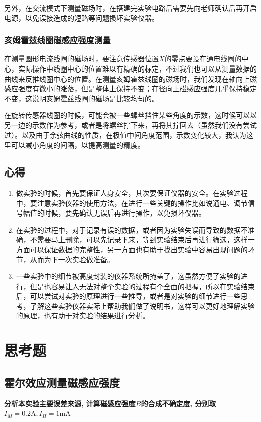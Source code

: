 \documentclass[zihao=5, UTF8]{article}
\theoremstyle{MyLineTheoremStyle} %
\theoremstyle{MyBlockTheoremStyle} %
\theoremstyle{MySubsubsectionStyle} %
\begin{document}
另外，在交流模式下测量磁场时，在搭建完实验电路后需要先向老师确认后再开启电源，以免误接造成的短路等问题损坏实验仪器。

\subsubsection{亥姆霍兹线圈磁感应强度测量}
在测量圆形电流线圈的磁场时，要注意传感器位置$X$的零点要设在通电线圈的中心，实际操作中线圈中心的位置难以有精确的标定，不过我们也可以从测量数据的曲线来反推线圈中心的位置。在测量亥姆霍兹线圈的磁场时，我们发现在轴向上磁感应强度有微小的涨落，但是整体上保持不变；在径向上磁感应强度几乎保持稳定不变，这说明亥姆霍兹线圈的磁场是比较均匀的。

在旋转传感器线圈的时候，可能会被一些螺丝挡住某些角度的示数，这时候可以以另一边的示数作为参考，或者是将螺丝拧下来，再将其拧回去（虽然我们没有尝试过）。以及由于余弦曲线的性质，在极值中间角度范围，示数变化较大，我认为这里可以减小角度的间隔，以提高测量的精度。
\subsection{心得}
\begin{enumerate}
    \item 做实验的时候，首先要保证人身安全，其次要保证仪器的安全。在实验过程中，要注意实验仪器的使用方法，在进行一些关键的操作比如说通电、调节信号幅值的时候，要先确认无误后再进行操作，以免损坏仪器。
    \item 在实验的过程中，对于记录有误的数据，或者因为实验失误而导致的数据不准确，不需要马上删除，可以先记录下来，等到实验结束后再进行筛选，这样一方面可以保证数据的完整性，另一方面也有助于找出实验中容易出现问题的环节，从而为下一次实验做准备。
    \item 一些实验中的细节被高度封装的仪器系统所掩盖了，这虽然方便了实验的进行，但是也容易让人无法对整个实验的过程有个全面的把握，所以在实验结束后，可以尝试对实验的原理进行一些推导，或者是对实验的细节进行一些思考，了解这些实验仪器实际上帮助我们做了说明书，这样可以更好地理解实验的原理，也有助于对实验的结果进行分析。
\end{enumerate}
\section{思考题}
\subsection{霍尔效应测量磁感应强度}
\textbf{分析本实验主要误差来源, 计算磁感应强度$B$的合成不确定度, 分别取$I_M = 0.2\mathrm{A}, I_H = 1\mathrm{mA}$}
\end{document}
